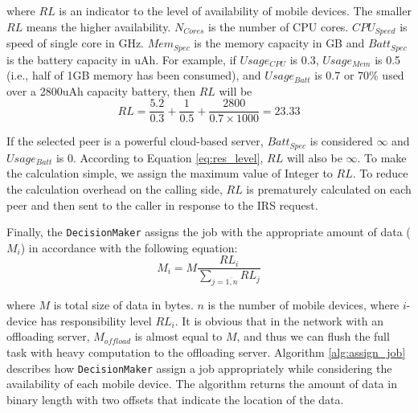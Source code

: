 \documentclass{sig-alternate}[10pt]
\begin{document}
\begin{CCSXML}
\noindent where $RL$ is an indicator to the level of availability of mobile devices. The smaller $RL$ means the higher availability. $N_{Cores}$ is the number of CPU cores. $CPU_{Speed}$ is speed of single core in GHz. $Mem_{Spec}$ is the memory capacity in GB and $Batt_{Spec}$ is the battery capacity in uAh. For example, if $Usage_{CPU}$ is 0.3, $Usage_{Mem}$ is 0.5 (i.e., half of 1GB memory has been consumed), and $Usage_{Batt}$ is 0.7 or 70\% used over a 2800uAh capacity battery, then $RL$ will be $$RL = \frac{5.2}{0.3} + \frac{1}{0.5} + \frac{2800}{0.7 \times 1000} = 23.33$$

If the selected peer is a powerful cloud-based server, $Batt_{Spec}$ is considered $\infty$ and $Usage_{Batt}$ is 0. According to Equation \ref{eq:res_level}, $RL$ will also be $\infty$. To make the calculation simple, we assign the maximum value of Integer to $RL$. To reduce the calculation overhead on the calling side, $RL$ is prematurely calculated on each peer and then sent to the caller in response to the IRS request.

Finally, the \texttt{DecisionMaker} assigns the job with the appropriate amount of data ($M_{i}$) in accordance with the following equation:
\begin{equation} 
\label{eq:data_amount}
M_{i} = M\frac{RL_{i}}{\sum_{j = \overline{1,n}}{RL_{j}}}
\end{equation}

\noindent where $M$ is total size of data in bytes. $n$ is the number of mobile devices, where $i$-device has responsibility level $RL_{i}$. It is obvious that in the network with an offloading server, $M_{offload}$ is almost equal to $M$, and thus we can flush the full task with heavy computation to the offloading server. Algorithm \ref{alg:assign_job} describes how \texttt{DecisionMaker} assign a job appropriately while considering the availability of each mobile device. The algorithm returns the amount of data in binary length with two offsets that indicate the location of the data.


\end{CCSXML}
\end{document}
